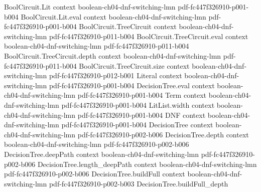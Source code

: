 \begin{lemma}
\label{LMN.layer2_composed_bound_base}
\leanok
{}
\proofstep
  {BoolCircuit.Lit}
  {context}
  {boolean-ch04-dnf-switching-lmn}
  {pdf-fc447f326910-p001-b004}
\proofstep
  {BoolCircuit.Lit.eval}
  {context}
  {boolean-ch04-dnf-switching-lmn}
  {pdf-fc447f326910-p001-b004}
\proofstep
  {BoolCircuit.TreeCircuit}
  {context}
  {boolean-ch04-dnf-switching-lmn}
  {pdf-fc447f326910-p011-b004}
\proofstep
  {BoolCircuit.TreeCircuit.eval}
  {context}
  {boolean-ch04-dnf-switching-lmn}
  {pdf-fc447f326910-p011-b004}
\proofstep
  {BoolCircuit.TreeCircuit.depth}
  {context}
  {boolean-ch04-dnf-switching-lmn}
  {pdf-fc447f326910-p011-b004}
\proofstep
  {BoolCircuit.TreeCircuit.size}
  {context}
  {boolean-ch04-dnf-switching-lmn}
  {pdf-fc447f326910-p012-b001}
\proofstep
  {Literal}
  {context}
  {boolean-ch04-dnf-switching-lmn}
  {pdf-fc447f326910-p001-b004}
\proofstep
  {DecisionTree.eval}
  {context}
  {boolean-ch04-dnf-switching-lmn}
  {pdf-fc447f326910-p001-b004}
\proofstep
  {Term}
  {context}
  {boolean-ch04-dnf-switching-lmn}
  {pdf-fc447f326910-p001-b004}
\proofstep
  {LitList.width}
  {context}
  {boolean-ch04-dnf-switching-lmn}
  {pdf-fc447f326910-p001-b004}
\proofstep
  {DNF}
  {context}
  {boolean-ch04-dnf-switching-lmn}
  {pdf-fc447f326910-p001-b004}
\proofstep
  {DecisionTree}
  {context}
  {boolean-ch04-dnf-switching-lmn}
  {pdf-fc447f326910-p002-b006}
\proofstep
  {DecisionTree.depth}
  {context}
  {boolean-ch04-dnf-switching-lmn}
  {pdf-fc447f326910-p002-b006}
\proofstep
  {DecisionTree.deepPath}
  {context}
  {boolean-ch04-dnf-switching-lmn}
  {pdf-fc447f326910-p002-b006}
\proofstep
  {DecisionTree.length_deepPath}
  {context}
  {boolean-ch04-dnf-switching-lmn}
  {pdf-fc447f326910-p002-b006}
\proofstep
  {DecisionTree.buildFull}
  {context}
  {boolean-ch04-dnf-switching-lmn}
  {pdf-fc447f326910-p002-b003}
\proofstep
  {DecisionTree.buildFull_depth}

\end{lemma}
